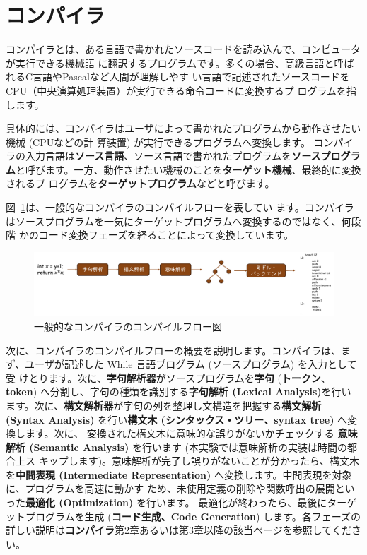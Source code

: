 \documentclass[a4paper,11pt]{jsarticle}
\begin{document}
\section{コンパイラ}
\label{sec:compiler}

コンパイラとは、ある言語で書かれたソースコードを読み込んで、コンピュータが実行できる機械語
に翻訳するプログラムです。多くの場合、高級言語と呼ばれるC言語やPascalなど人間が理解しやす
い言語で記述されたソースコードをCPU（中央演算処理装置）が実行できる命令コードに変換するプ
ログラムを指します。

具体的には、コンパイラはユーザによって書かれたプログラムから動作させたい機械 (CPUなどの計
算装置) が実行できるプログラムへ変換します。
コンパイラの入力言語は\textbf{ソース言語}、ソース言語で書かれたプログラムを\textbf{ソースプログラ
ム}と呼びます。一方、動作させたい機械のことを\textbf{ターゲット機械}、最終的に変換されるプ
ログラムを\textbf{ターゲットプログラム}などと呼びます。

図~\ref{fig:compilation_flow}は、一般的なコンパイラのコンパイルフローを表してい
ます。コンパイラはソースプログラムを一気にターゲットプログラムへ変換するのではなく、何段階
かのコード変換フェーズを経ることによって変換しています。

\begin{figure}[t]
  \centering
  \includegraphics[width=\linewidth]{figs/compiler_structure_overview.pdf}
  \caption{一般的なコンパイラのコンパイルフロー図}
  \label{fig:compilation_flow}
\end{figure}

次に、コンパイラのコンパイルフローの概要を説明します。コンパイラは、まず、ユーザが記述した
While 言語プログラム (ソースプログラム) を入力として受
けとります。次に、\textbf{字句解析器}がソースプログラムを\textbf{字句} (\textbf{トークン}、
\textbf{token}) へ分割し、字句の種類を識別する\textbf{字句解析 (Lexical Analysis)}を行い
ます。次に、\textbf{構文解析器}が字句の列を整理し文構造を把握する\textbf{構文解析 (Syntax
  Analysis)} を行い\textbf{構文木 (シンタックス・ツリー、syntax tree)} へ変換します。次に、
変換された構文木に意味的な誤りがないかチェックする
\textbf{意味解析 (Semantic Analysis)} を行います (本実験では意味解析の実装は時間の都合上ス
キップします)。意味解析が完了し誤りがないことが分かったら、構文木を\textbf{中間表現
  (Intermediate Representation)} へ変換します。中間表現を対象に、プログラムを高速に動かす
ため、未使用定義の削除や関数呼出の展開といった\textbf{最適化 (Optimization)} を行います。
最適化が終わったら、最後にターゲットプログラムを生成 (\textbf{コード生成、Code
  Generation}) します。各フェーズの詳しい説明は\textbf{コンパイラ}第2章あるいは第3章以降の該当ページを参照してください。
\end{document}
